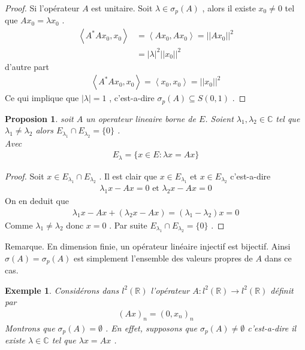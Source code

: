 \documentclass{report}
\newtheorem{Ex}{Exemple}[subsection]
\newtheorem{Prop}{Proposion}[subsection]
\begin{document}
{\begin{proof}
 Si l'opérateur $A$ est unitaire. Soit $\lambda \in \sigma_p(A)$ , alors il existe $x_0 \neq 0$ tel que $A x_0 = \lambda x_0$ .
					\begin{align*}
						 \left< A^*Ax_0,x_0 \right> &= \left< Ax_0,Ax_0 \right> = ||Ax_0||^2 \\
						 &= |\lambda|^2 ||x_0||^2 
					\end{align*}
 d'autre part 
					\begin{align*}
 						 \left< A^* A x_0,x_0 \right> = \left< x_0,x_0 \right> = ||x_0||^2 
					\end{align*}
 Ce qui implique que $|\lambda| = 1$ , c'est-a-dire $\sigma_p(A) \subseteq S(0,1)$ .
\end{proof}





\begin{Prop} soit $A$ un operateur lineaire borne de $E$. Soient $\lambda_1, \lambda_2 \in \mathbb{C}$ tel que $\lambda_1 \neq \lambda_2$ alors $E_{\lambda_1} \cap E_{\lambda_2} = \{0\}$ .\\
	Avec 
					\begin{align*}
				 E_{\lambda} = \{x \in E : \lambda x = A x\} 
					\end{align*}
\end{Prop}
\begin{proof}
Soit $x \in E_{\lambda_1} \cap E_{\lambda_2}$ . Il est clair que $x \in E_{\lambda_1}$ et $x \in E_{\lambda_2}$ c'est-a-dire 
					\begin{align*}
				 \lambda_1 x - Ax = 0 \,\,\text{et}\,\, \lambda_2 x - Ax = 0 
					\end{align*}
On en deduit que 
					\begin{align*}
				 \lambda_1x - Ax + (\lambda_2x - Ax) = (\lambda_1 - \lambda_2)x = 0 
					\end{align*}
Comme $\lambda_1 \neq \lambda_2$ donc $x = 0$ . Par suite $E_{\lambda_1} \cap E_{\lambda_2} = \{0\}$ .
\end{proof}


Remarque. En dimension finie, un opérateur linéaire injectif est bijectif. Ainsi $\sigma(A) = \sigma_p(A)$ est simplement l'ensemble des valeurs propres de $A$ dans ce cas.\\

\begin{Ex} Considérons dans $l^2(\mathbb{R})$ l'opérateur $A: l^2(\mathbb{R}) \rightarrow l^2(\mathbb{R})$ définit par  
					\begin{align*}
					 (Ax)_n = (0,x_n)_n 
					\end{align*}
	Montrons que $\sigma_p(A) = \emptyset$ . En effet, supposons que $\sigma_p(A) \neq \emptyset$ c'est-a-dire il existe $\lambda \in \mathbb{C}$ tel que $\lambda x = A x$ .\\


\end{Ex}}
\end{document}
